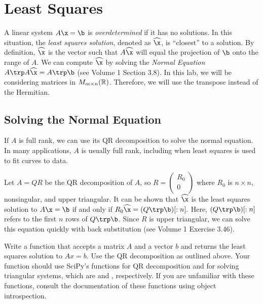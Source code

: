\label{lab:givens}

\section*{Least Squares}

A linear system $A\x=\b$ is \emph{overdetermined} if it has no solutions. 
In this situation, the \emph{least squares solution}, denoted as $\widehat{\x}$, is ``closest'' to a solution. 
By definition, $\widehat{\x}$ is the vector such that $A\widehat{\x}$ will equal the projection of $\b$ onto the range of $A$. 
We can compute $\widehat{\x}$ by solving the \emph{Normal Equation} $A\trp A\widehat{\x} = A\trp \b$ (see Volume 1 Section 3.8). In this lab, we will be considering matrices in $M_{m \times n}(\Bbb{R})$. Therefore, we will use the transpose instead of the Hermitian.


\subsection*{Solving the Normal Equation}
If $A$ is full rank, we can use its QR decomposition to solve the normal equation. 
In many applications, $A$ is usually full rank, including when least squares is used to fit curves to data.

Let $A=QR$ be the QR decomposition of $A$, so $R = \left(\begin{array}{c}R_0\\
0\\ \end{array} \right)$
where $R_0$ is $n \times n$, nonsingular, and upper triangular. 
It can be shown that $\widehat{\x}$ is the least squares solution to $A\x=\b$ if and only if $R_0\widehat{\x} = (Q\trp \b)[:n].$ 
Here, $(Q\trp \b)[:n]$ refers to the first $n$ rows of $Q\trp \b$.
Since $R$ is upper triangular, we can solve this equation quickly with back substitution (see Volume 1 Exercise 3.46).

\begin{problem}
Write a function that accepts a matrix $A$ and a vector $b$ and returns the least squares solution to $Ax=b$.
Use the QR decomposition as outlined above.
Your function should use SciPy's functions for QR decomposition and for solving triangular systems, which are  and , respectively. If you are unfamiliar with these functions, consult the documentation of these functions using object introspection.
\end{problem}

